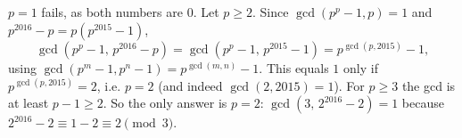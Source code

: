 $p=1$ fails, as both numbers are $0$. Let $p\ge2$. Since $\gcd(p^p-1,p)=1$ and $p^{2016}-p=p\left(p^{2015}-1\right)$,
\[
\gcd\left(p^p-1,\,p^{2016}-p\right)=\gcd\left(p^p-1,\,p^{2015}-1\right)=p^{\gcd(p,2015)}-1,
\]
using $\gcd(p^m-1,p^n-1)=p^{\gcd(m,n)}-1$. This equals $1$ only if $p^{\gcd(p,2015)}=2$, i.e. $p=2$ (and indeed $\gcd(2,2015)=1$). For $p\ge3$ the gcd is at least $p-1\ge2$. So the only answer is $\boxed{p=2}$: $\gcd(3,\,2^{2016}-2)=1$ because $2^{2016}-2\equiv1-2\equiv2\pmod3$.
